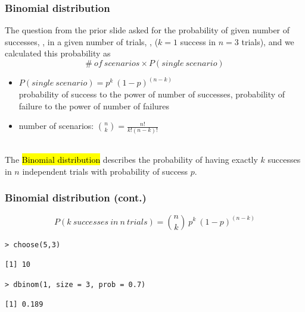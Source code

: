 \documentclass[slidestop,compress,mathserif,12pt,t,professionalfonts,xcolor=table]{beamer}
\begin{document}

\begin{frame}
\frametitle{Binomial distribution}

The question from the prior slide asked for the probability of given number of successes, , in a given number of trials, , ($k = 1$ success in $n = 3$ trials), and we calculated this probability as
\[ \#~of~scenarios \times P(single~scenario) \]

\pause

\begin{itemize}

\item $P(single~scenario) = p^k~(1-p)^{(n-k)}$ \\
{\tiny probability of success to the power of number of successes, probability of failure to the power of number of failures}

\pause

\item number of scenarios: ${n \choose k} = \frac{n!}{k! (n - k)!}$

\end{itemize}

\pause
$\:$ \\

The \hl{Binomial distribution} describes the probability of having exactly $k$
successes in $n$ independent trials with probability of success $p$.

\end{frame}


\begin{frame}[fragile]
\frametitle{Binomial distribution (cont.)}

\[P(k~successes~in~n~trials) = {n \choose k}~p^k~(1-p)^{(n-k)} \] 

\pause

{\footnotesize
\begin{Verbatim}[frame=single, formatcom=\color{blue}]
> choose(5,3)
\end{Verbatim}
}
{\footnotesize
\begin{Verbatim}[frame=single, formatcom=\color{gray}]
[1] 10
\end{Verbatim}
}
\pause
{}
{\footnotesize
\begin{Verbatim}[frame=single, formatcom=\color{blue}]
> dbinom(1, size = 3, prob = 0.7)
\end{Verbatim}
}
{\footnotesize
\begin{Verbatim}[frame=single, formatcom=\color{gray}]
[1] 0.189
\end{Verbatim}
}

\end{frame}
\end{document}
